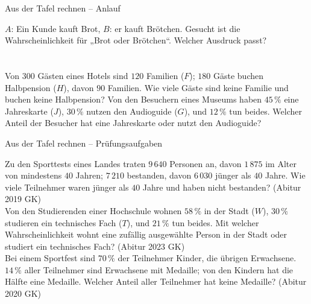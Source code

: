 \begin{aufgabe}{Aus der Tafel rechnen – Anlauf}
\begin{teile}
\teil $A$: Ein Kunde kauft Brot, $B$: er kauft Brötchen. Gesucht ist die Wahrscheinlichkeit für „Brot oder Brötchen“. Welcher Ausdruck passt? \\  \\  \\ 
\teil Von $300$ Gästen eines Hotels sind $120$ Familien ($F$); $180$ Gäste buchen Halbpension ($H$), davon $90$ Familien. Wie viele Gäste sind keine Familie und buchen keine Halbpension? \leerfeld
\teil Von den Besuchern eines Museums haben $45\,\%$ eine Jahreskarte ($J$), $30\,\%$ nutzen den Audioguide ($G$), und $12\,\%$ tun beides. Welcher Anteil der Besucher hat eine Jahreskarte oder nutzt den Audioguide? \leerfeld[\%]
\end{teile}
\end{aufgabe}

\begin{aufgabe}{Aus der Tafel rechnen – Prüfungsaufgaben}
\begin{teile}
\teil Zu den Sporttests eines Landes traten $9\,640$ Personen an, davon $1\,875$ im Alter von mindestens $40$ Jahren; $7\,210$ bestanden, davon $6\,030$ jünger als $40$ Jahre. Wie viele Teilnehmer waren jünger als $40$ Jahre und haben nicht bestanden? \hfill (Abitur 2019 GK) \\ \leerfeld
\teil Von den Studierenden einer Hochschule wohnen $58\,\%$ in der Stadt ($W$), $30\,\%$ studieren ein technisches Fach ($T$), und $21\,\%$ tun beides. Mit welcher Wahrscheinlichkeit wohnt eine zufällig ausgewählte Person in der Stadt oder studiert ein technisches Fach? \hfill (Abitur 2023 GK) \\ \leerfeld[\%]
\teil Bei einem Sportfest sind $70\,\%$ der Teilnehmer Kinder, die übrigen Erwachsene. $14\,\%$ aller Teilnehmer sind Erwachsene mit Medaille; von den Kindern hat die Hälfte eine Medaille. Welcher Anteil aller Teilnehmer hat keine Medaille? \hfill (Abitur 2020 GK) \\ \leerfeld[\%]
\end{teile}
\end{aufgabe}
